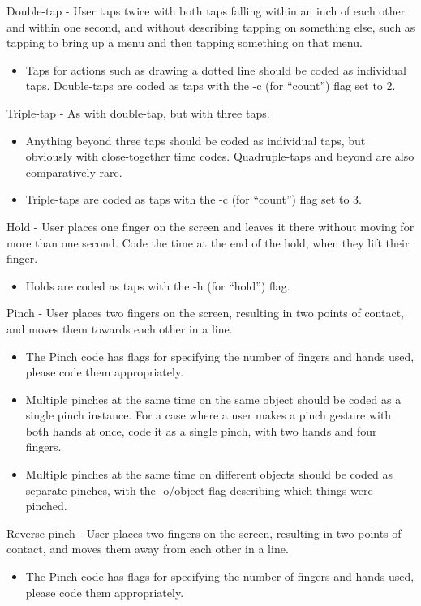 Double-tap - User taps twice with both taps falling within an inch of each other and within one second, and without describing tapping on something else, such as tapping to bring up a menu and then tapping something on that menu. 
\begin{itemize}
	\item Taps for actions such as drawing a dotted line should be coded as individual taps. 
Double-taps are coded as taps with the -c (for “count”) flag set to 2. 
\end{itemize}

Triple-tap - As with double-tap, but with three taps. 
\begin{itemize}
	\item Anything beyond three taps should be coded as individual taps, but obviously with close-together time codes. Quadruple-taps and beyond are also comparatively rare. 
	\item Triple-taps are coded as taps with the -c (for “count”) flag set to 3. 
\end{itemize}

Hold - User places one finger on the screen and leaves it there without moving for more than one second. Code the time at the end of the hold, when they lift their finger. 
\begin{itemize}
	\item Holds are coded as taps with the -h (for “hold”) flag. 
\end{itemize}

Pinch - User places two fingers on the screen, resulting in two points of contact, and moves them towards each other in a line. 
\begin{itemize}
	\item The Pinch code has flags for specifying the number of fingers and hands used, please code them appropriately.
	\item Multiple pinches at the same time on the same object should be coded as a single pinch instance. For a case where a user makes a pinch gesture with both hands at once, code it as a single pinch, with two hands and four fingers. 
	\item Multiple pinches at the same time on different objects should be coded as separate pinches, with the -o/object flag describing which things were pinched. 
\end{itemize}

Reverse pinch - User places two fingers on the screen, resulting in two points of contact, and moves them away from each other in a line. 
\begin{itemize}
	\item The Pinch code has flags for specifying the number of fingers and hands used, please code them appropriately.
\end{itemize}

